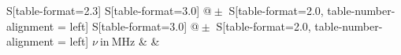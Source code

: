\begin{table}
    \centering
    \caption{Stromstärke $I_1,I_2$ beim Auftreten des Maximums für verschiedene Anregungsfrequenzen $\nu$}
    \label{tab:Werte}
    \begin{tabular}{
	S[table-format=2.3]
	S[table-format=3.0]
	@{${}\pm{}$}
	S[table-format=2.0, table-number-alignment = left]
	S[table-format=3.0]
	@{${}\pm{}$}
	S[table-format=2.0, table-number-alignment = left]
	}
	\toprule
	{$\nu \ \mathrm{in} \ \si{\mega\hertz}$}		& 		& 
			\\ 
	\midrule
    
    \bottomrule
    \end{tabular}
    \end{table}
